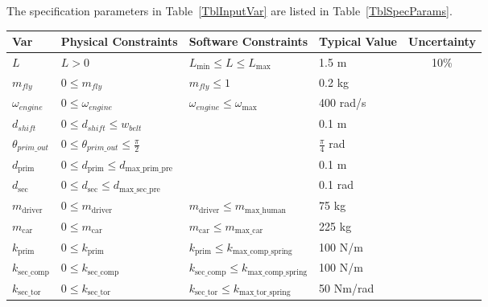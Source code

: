 \documentclass[12pt]{article}
\begin{document}
The specification parameters in Table~\ref{TblInputVar} are listed in
Table~\ref{TblSpecParams}.

\begin{table}[!h]
  \caption{Input Variables} \label{TblInputVar}
  \renewcommand{\arraystretch}{1.2}
\noindent \begin{longtable*}{l l l l c} 
  \toprule
  \textbf{Var} & \textbf{Physical Constraints} & \textbf{Software Constraints} &
                             \textbf{Typical Value} & \textbf{Uncertainty}\\
  \midrule 
  $L$ & $L > 0$ & $L_{\text{min}} \leq L \leq L_{\text{max}}$ & 1.5 \si[per-mode=symbol] {\metre} & 10\%\\
  $m_{fly}$ & $0 \leq m_{fly}$ & $m_{fly} \leq 1$ & 0.2 kg\\
  $\omega_{engine}$ & $0 \leq \omega_{engine}$ & $\omega_{engine} \leq \omega_\text{max}$ & 400 rad/s\\
  $d_{shift}$ & $0 \leq d_{shift} \leq w_{belt}$ & & 0.1 m\\
  $\theta_{prim\_out}$ & $0 \leq \theta_{prim\_out} \leq \frac{\pi}{2}$ & & $\frac{\pi}{4}$ rad\\
  $d_{\text{prim}}$ & $0 \leq d_{\text{prim}} \leq d_\text{max\_prim\_pre}$ & & 0.1 m\\
  $d_{\text{sec}}$ & $0 \leq d_{\text{sec}} \leq d_\text{max\_sec\_pre}$ & & 0.1 rad\\
  $m_{\text{driver}}$ & $0 \leq m_{\text{driver}}$ & $ m_{\text{driver}} \leq m_\text{max\_human}$ & 75 kg\\
  $m_{\text{car}}$ & $0 \leq m_{\text{car}}$ & $m_{\text{car}} \leq m_\text{max\_car}$ & 225 kg\\
  $k_{\text{prim}}$ & $0 \leq k_{\text{prim}}$ & $k_{\text{prim}} \leq k_\text{max\_comp\_spring}$ & 100 N/m\\
  $k_{\text{sec\_comp}}$ & $0 \leq k_{\text{sec\_comp}}$ & $k_{\text{sec\_comp}} \leq k_\text{max\_comp\_spring}$ & 100 N/m\\
  $k_{\text{sec\_tor}}$ & $0 \leq k_{\text{sec\_tor}}$ & $k_{\text{sec\_tor}} \leq k_\text{max\_tor\_spring}$ & 50 Nm/rad\\
  \bottomrule
\end{longtable*}
\end{table}

\noindent
\end{document}
